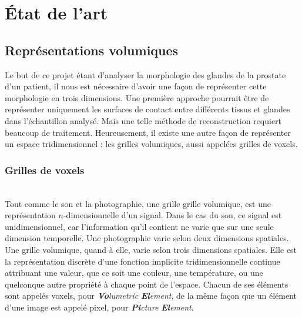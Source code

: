 \chapter{État de l'art}\label{chapter:02:stateoftheart}
{
	\par

	\section{Représentations volumiques}
	{
		Le but de ce projet étant d'analyser la morphologie des glandes de la prostate d'un patient, il nous est nécessaire d'avoir une façon de représenter cette morphologie en trois dimensions. Une première approche pourrait être de représenter uniquement les surfaces de contact entre différents tissus et glandes dans l'échantillon analysé. Mais une telle méthode de reconstruction requiert beaucoup de traitement. Heureusement, il existe une autre façon de représenter un espace tridimensionnel : les grilles volumiques, aussi appelées grilles de voxels.\par

		\subsection{Grilles de voxels}
		{
			\\

			Tout comme le son et la photographie, une grille grille volumique, est une représentation $n$-dimensionnelle d'un signal. Dans le cas du son, ce signal est unidimensionnel, car l'information qu'il contient ne varie que sur une seule dimension temporelle. Une photographie varie selon deux dimensions spatiales. Une grille volumique, quand à elle, varie selon trois dimensions spatiales. Elle est la représentation discrète d'une fonction implicite tridimensionnelle continue attribuant une valeur, que ce soit une couleur, une température, ou une quelconque autre propriété à chaque point de l'espace. Chacun de ses éléments sont appelés voxels, pour \textit{\textbf{Vo}}\textit{lumetric} \textit{\textbf{El}}\textit{ement}, de la même façon que un élément d'une image est appelé pixel, pour \textit{\textbf{Pi}}\textit{cture} \textbf{\textit{El}}\textit{ement}.\par

}}}

